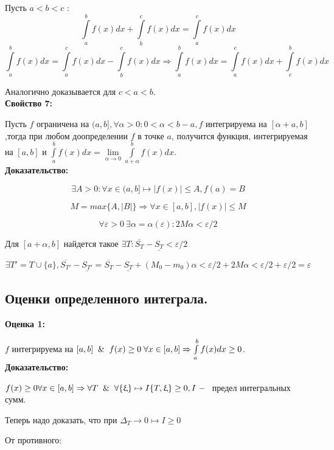 \documentclass[a4paper,12pt]{article} %
\begin{document}
Пусть $ a < b < c $ : \\[2 mm]
$$\int\limits_a^b f(x)dx + \int\limits_b^c f(x)dx = \int\limits_a^c f(x)dx$$
$$\int\limits_a^b f(x)dx = \int\limits_a^c f(x)dx - \int\limits_b^c f(x)dx  \Rightarrow \int\limits_a^b f(x)dx = \int\limits_a^c f(x)dx + \int\limits_c^b f(x)dx $$

Аналогично доказывается для $ c < a < b$. \\ [2mm]

\textbf{Свойство 7:}

Пусть $f$ ограничена на $(a,b], \forall \alpha > 0: 0<\alpha<b-a, f $ интегрируема на $[\alpha+a, b]$,тогда при любом доопределении $f$ в точке $a$, получится функция, интегрируемая на $[a,b]$ и $\int\limits_a^b f(x) dx = \lim \limits_{\alpha \rightarrow 0} \int\limits_{a+\alpha}^b f(x)dx$.\\

\textbf{Доказательство:}

$$\exists A>0: \forall x \in (a,b] \longmapsto |f(x)|\leq A, f(a) = B$$

$$M = max\{A, |B|\} \Rightarrow \forall x \in [a,b], |f(x)|\leq M$$

$$\forall\varepsilon > 0 ~\exists \alpha = \alpha(\varepsilon):2M\alpha< \varepsilon/2$$

Для $[a+\alpha, b]$ найдется такое  $\exists T: \overline{S_T}- \underline{S_T}< \varepsilon/2$

$$\exists T' = T \cup \{a\}, \overline{S_{T'}}- \underline{S_{T'}}= \overline{S_T}- \underline{S_T}+(M_0-m_0)\alpha<\varepsilon/2+2M\alpha<\varepsilon/2+\varepsilon/2=\varepsilon $$

\subsection{Оценки определенного интеграла.}

\textbf{Оценка 1:}

    $f$  интегрируема на $[a,b] \And f(x)\geq 0 \; \forall x \in [a,b]\Rightarrow \int\limits_a^b f(x)dx \geq 0$.\\
    
\textbf{Доказательство:}

    $f(x)\geq 0 \forall x \in [a,b]\Rightarrow \forall T \And \forall \{\upxi\}\mapsto I\{T,\upxi \}\geq 0, I ~-~$ предел интегральных сумм.
    
    Теперь надо доказать, что при $\Delta_T \rightarrow 0 \mapsto I\geq 0$
    
    От противного:
    
\end{document}
